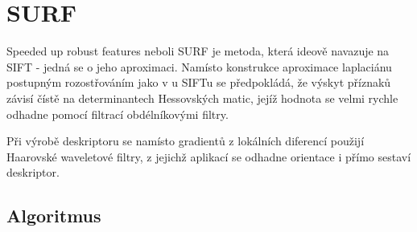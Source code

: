 \section{SURF}

	Speeded up robust features neboli SURF \cite{bay2006surf} je metoda, která ideově navazuje na SIFT - jedná se o jeho aproximaci. Namísto konstrukce aproximace laplaciánu postupným rozostřováním jako v u SIFTu se předpokládá, že výskyt příznaků závisí čístě na determinantech Hessovských matic, jejíž hodnota se velmi rychle odhadne pomocí filtrací obdélníkovými filtry.
	
	Při výrobě deskriptoru se namísto gradientů z lokálních diferencí použijí Haarovské waveletové filtry, z jejichž aplikací se odhadne orientace i přímo sestaví deskriptor. 
	
\subsection{Algoritmus}

